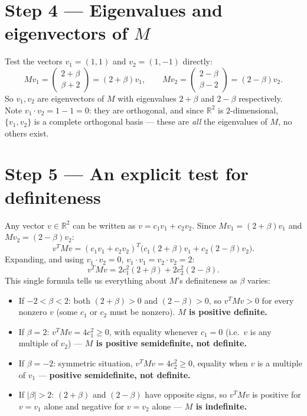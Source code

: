 \documentclass[11pt]{article}
\newcommand{\R}{\mathbb{R}}
\begin{document}
\section*{Step 4 --- Eigenvalues and eigenvectors of $M$}

Test the vectors $v_1=(1,1)$ and $v_2=(1,-1)$ directly:
\[
Mv_1 = \begin{pmatrix}2+\beta\\ \beta+2\end{pmatrix} = (2+\beta)v_1, \qquad Mv_2 = \begin{pmatrix}2-\beta\\ \beta-2\end{pmatrix} = (2-\beta)v_2.
\]
So $v_1,v_2$ are eigenvectors of $M$ with eigenvalues $2+\beta$ and $2-\beta$ respectively. Note $v_1\cdot v_2 = 1-1=0$: they are orthogonal, and since $\R^2$ is $2$-dimensional, $\{v_1,v_2\}$ is a complete orthogonal basis --- these are \emph{all} the eigenvalues of $M$, no others exist.

\section*{Step 5 --- An explicit test for definiteness}

Any vector $v\in\R^2$ can be written as $v=c_1v_1+c_2v_2$. Since $Mv_1=(2+\beta)v_1$ and $Mv_2=(2-\beta)v_2$:
\[
v^TMv = (c_1v_1+c_2v_2)^T\big(c_1(2+\beta)v_1+c_2(2-\beta)v_2\big).
\]
Expanding, and using $v_1\cdot v_2=0$, $v_1\cdot v_1=v_2\cdot v_2=2$:
\[
v^TMv = 2c_1^2(2+\beta) + 2c_2^2(2-\beta).
\]
This single formula tells us everything about $M$'s definiteness as $\beta$ varies:
\begin{itemize}[leftmargin=1.5em]
\item If $-2<\beta<2$: both $(2+\beta)>0$ and $(2-\beta)>0$, so $v^TMv>0$ for every nonzero $v$ (some $c_1$ or $c_2$ must be nonzero). \textbf{$M$ is positive definite.}
\item If $\beta=2$: $v^TMv = 4c_1^2 \ge 0$, with equality whenever $c_1=0$ (i.e.\ $v$ is any multiple of $v_2$) --- \textbf{$M$ is positive semidefinite, not definite.}
\item If $\beta=-2$: symmetric situation, $v^TMv=4c_2^2\ge0$, equality when $v$ is a multiple of $v_1$ --- \textbf{positive semidefinite, not definite.}
\item If $|\beta|>2$: $(2+\beta)$ and $(2-\beta)$ have opposite signs, so $v^TMv$ is positive for $v=v_1$ alone and negative for $v=v_2$ alone --- \textbf{$M$ is indefinite.}
\end{itemize}
\end{document}
